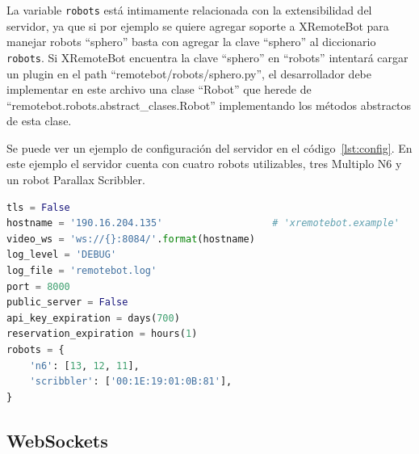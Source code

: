 La variable \texttt{robots} está intimamente
relacionada con la extensibilidad del servidor, ya que si por ejemplo
se quiere agregar soporte a XRemoteBot para manejar robots ``sphero''
basta con agregar la clave ``sphero'' al diccionario
\texttt{robots}. Si XRemoteBot encuentra la clave ``sphero'' en ``robots''
intentará cargar un plugin en el path
``remotebot/robots/sphero.py'',
el desarrollador debe implementar en este archivo una clase ``Robot''
que herede de ``remotebot.robots.abstract\_clases.Robot'' implementando
los métodos abstractos de esta clase.

Se puede ver un ejemplo de configuración del servidor en el
código~\ref{lst:config}. En este ejemplo el servidor cuenta
con cuatro robots utilizables, tres Multiplo N6 y un robot
Parallax Scribbler.

\begin{lstlisting}[language=python,
    caption={Configuración de ejemplo de XRemoteBot en
    \texttt{configuration.py}},
    label=lst:config]
tls = False
hostname = '190.16.204.135'                   # 'xremotebot.example'
video_ws = 'ws://{}:8084/'.format(hostname)
log_level = 'DEBUG'
log_file = 'remotebot.log'
port = 8000
public_server = False
api_key_expiration = days(700)
reservation_expiration = hours(1)
robots = {
    'n6': [13, 12, 11],
    'scribbler': ['00:1E:19:01:0B:81'],
}
\end{lstlisting}

% 
% 

\subsection{WebSockets}\label{sec:websockets}

